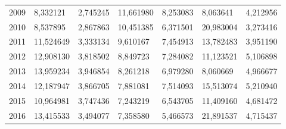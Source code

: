 \begin{table}
\begin{tabular}{p{1cm}p{2cm}p{2cm}p{2cm}p{2cm}p{2cm}p{2cm}}
 2009 &                         8,332121 &                                     2,745245 &                     11,661980 &     8,253083 &           8,063641 &                                   4,212956 \\
 2010 &                         8,537895 &                                     2,867863 &                     10,451385 &     6,371501 &          20,983004 &                                   3,273416 \\
 2011 &                        11,524649 &                                     3,333134 &                      9,610167 &     7,454913 &          13,782483 &                                   3,951190 \\
 2012 &                        12,908130 &                                     3,818502 &                      8,849723 &     7,284082 &          11,123521 &                                   5,106898 \\
 2013 &                        13,959234 &                                     3,946854 &                      8,261218 &     6,979280 &           8,060669 &                                   4,966677 \\
 2014 &                        12,187947 &                                     3,866705 &                      7,881081 &     7,514093 &          15,513074 &                                   5,210940 \\
 2015 &                        10,964981 &                                     3,747436 &                      7,243219 &     6,543705 &          11,409160 &                                   4,681472 \\
 2016 &                        13,415533 &                                     3,494077 &                      7,358580 &     5,466573 &          21,891537 &                                   4,715437 \\
\bottomrule
\end{tabular}
\end{table}
